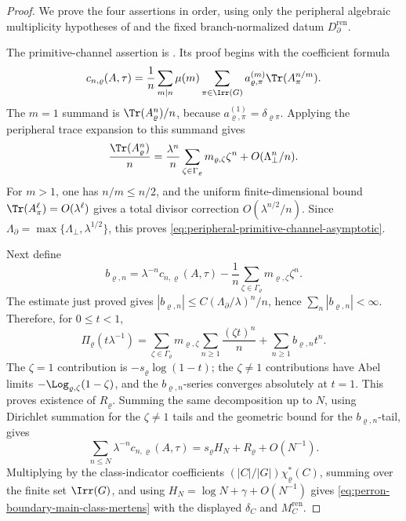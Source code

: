 \begin{proof}
  We prove the four assertions in order, using only the peripheral algebraic
  multiplicity hypotheses of
  and the fixed branch-normalized datum \(D_{\partial}^{\mathrm{ren}}\).

  The primitive-channel assertion is
  .  Its proof
  begins with the coefficient formula
  \[
    c_{n,\varrho}(A,\tau)
    =
    \frac1n\sum_{m\mid n}\mu(m)
      \sum_{\pi\in\Irr(G)}
        a_{\varrho,\pi}^{(m)}\Tr(A_\pi^{n/m}).
  \]
  The \(m=1\) summand is \(\Tr(A_\varrho^n)/n\), because
  \(a_{\varrho,\pi}^{(1)}=\delta_{\varrho\pi}\).  Applying the peripheral
  trace expansion to this summand gives
  \[
    \frac{\Tr(A_\varrho^n)}n
    =
    \frac{\lambda^n}{n}
      \sum_{\zeta\in\Gamma_\varrho}m_{\varrho,\zeta}\zeta^n
    +O(\Lambda_\perp^n/n).
  \]
  For \(m>1\), one has \(n/m\le n/2\), and the uniform finite-dimensional
  bound \(\Tr(A_\pi^\ell)=O(\lambda^\ell)\) gives a total divisor correction
  \(O(\lambda^{n/2}/n)\).  Since
  \(\Lambda_\partial=\max\{\Lambda_\perp,\lambda^{1/2}\}\), this proves
  \eqref{eq:peripheral-primitive-channel-asymptotic}.

  Next define
  \[
    b_{\varrho,n}
    =
    \lambda^{-n}c_{n,\varrho}(A,\tau)
    -\frac1n\sum_{\zeta\in\Gamma_\varrho}m_{\varrho,\zeta}\zeta^n .
  \]
  The estimate just proved gives
  \(|b_{\varrho,n}|\le C(\Lambda_\partial/\lambda)^n/n\), hence
  \(\sum_n|b_{\varrho,n}|<\infty\).  Therefore, for \(0\le t<1\),
  \[
    \Pi_\varrho(t\lambda^{-1})
    =
    \sum_{\zeta\in\Gamma_\varrho}
      m_{\varrho,\zeta}\sum_{n\ge1}\frac{(\zeta t)^n}{n}
    +\sum_{n\ge1}b_{\varrho,n}t^n .
  \]
  The \(\zeta=1\) contribution is \(-s_\varrho\log(1-t)\); the
  \(\zeta\ne1\) contributions have Abel limits
  \(-\Log_{\varrho,\zeta}(1-\zeta)\), and the \(b_{\varrho,n}\)-series converges
  absolutely at \(t=1\).  This proves existence of \(R_\varrho\).  Summing
  the same decomposition up to \(N\), using Dirichlet summation for the
  \(\zeta\ne1\) tails and the geometric bound for the \(b_{\varrho,n}\)-tail,
  gives
  \[
    \sum_{n\le N}\lambda^{-n}c_{n,\varrho}(A,\tau)
    =
    s_\varrho H_N+R_\varrho+O(N^{-1}).
  \]
  Multiplying by the class-indicator coefficients
  \((|C|/|G|)\chi_\varrho^\ast(C)\), summing over the finite set
  \(\Irr(G)\), and using \(H_N=\log N+\gamma+O(N^{-1})\) gives
  \eqref{eq:perron-boundary-main-class-mertens} with the displayed
  \(\delta_C\) and \(M_C^{\mathrm{ren}}\).


\end{proof}
